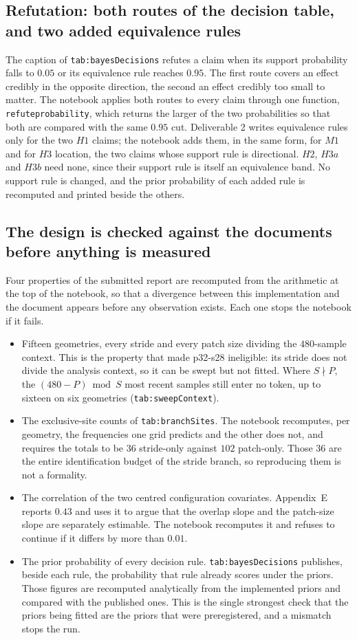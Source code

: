 \documentclass[10pt,a4paper]{article}
\newcommand{\code}[1]{\texttt{\UseBreakableUnderscores #1}}
\newcommand{\UseBreakableUnderscores}{\def\_{\textunderscore\allowbreak}}
\begin{document}
\subsection{Refutation: both routes of the decision table, and two added equivalence rules}
The caption of \code{tab:bayesDecisions} refutes a claim when its support probability falls to $0.05$ or its equivalence rule reaches $0.95$. The first route covers an effect credibly in the opposite direction, the second an effect credibly too small to matter. The notebook applies both routes to every claim through one function, \code{refute\_probability}, which returns the larger of the two probabilities so that both are compared with the same $0.95$ cut. Deliverable 2 writes equivalence rules only for the two $H1$ claims; the notebook adds them, in the same form, for $M1$ and for $H3$ location, the two claims whose support rule is directional. $H2$, $H3a$ and $H3b$ need none, since their support rule is itself an equivalence band. No support rule is changed, and the prior probability of each added rule is recomputed and printed beside the others.

\subsection{The design is checked against the documents before anything is measured}
Four properties of the submitted report are recomputed from the arithmetic at the top of the notebook, so that a divergence between this implementation and the document appears before any observation exists. Each one stops the notebook if it fails.
\begin{itemize}
\item Fifteen geometries, every stride and every patch size dividing the $480$-sample context. This is the property that made p32-s28 ineligible: its stride does not divide the analysis context, so it can be swept but not fitted. Where $S\nmid P$, the $(480-P)\bmod S$ most recent samples still enter no token, up to sixteen on six geometries (\code{tab:sweepContext}).
\item The exclusive-site counts of \code{tab:branchSites}. The notebook recomputes, per geometry, the frequencies one grid predicts and the other does not, and requires the totals to be $36$ stride-only against $102$ patch-only. Those $36$ are the entire identification budget of the stride branch, so reproducing them is not a formality.
\item The correlation of the two centred configuration covariates. Appendix~E reports $0.43$ and uses it to argue that the overlap slope and the patch-size slope are separately estimable. The notebook recomputes it and refuses to continue if it differs by more than $0.01$.
\item The prior probability of every decision rule. \code{tab:bayesDecisions} publishes, beside each rule, the probability that rule already scores under the priors. Those figures are recomputed analytically from the implemented priors and compared with the published ones. This is the single strongest check that the priors being fitted are the priors that were preregistered, and a mismatch stops the run.
\end{itemize}
\end{document}
